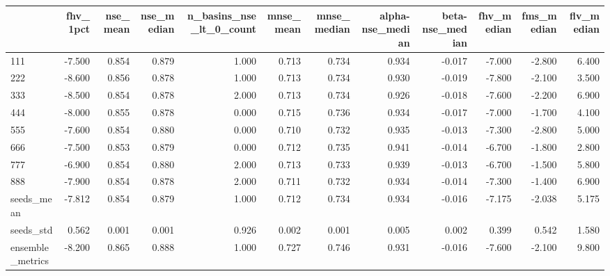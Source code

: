 \begin{tabular}{lrrrrrrrrrrr}
\toprule
 & fhv_1pct & nse_mean & nse_median & n_basins_nse_lt_0_count & mnse_mean & mnse_median & alpha-nse_median & beta-nse_median & fhv_median & fms_median & flv_median \\
\midrule
111 & -7.500 & 0.854 & 0.879 & 1.000 & 0.713 & 0.734 & 0.934 & -0.017 & -7.000 & -2.800 & 6.400 \\
222 & -8.600 & 0.856 & 0.878 & 1.000 & 0.713 & 0.734 & 0.930 & -0.019 & -7.800 & -2.100 & 3.500 \\
333 & -8.500 & 0.854 & 0.878 & 2.000 & 0.713 & 0.734 & 0.926 & -0.018 & -7.600 & -2.200 & 6.900 \\
444 & -8.000 & 0.855 & 0.878 & 0.000 & 0.715 & 0.736 & 0.934 & -0.017 & -7.000 & -1.700 & 4.100 \\
555 & -7.600 & 0.854 & 0.880 & 0.000 & 0.710 & 0.732 & 0.935 & -0.013 & -7.300 & -2.800 & 5.000 \\
666 & -7.500 & 0.853 & 0.879 & 0.000 & 0.712 & 0.735 & 0.941 & -0.014 & -6.700 & -1.800 & 2.800 \\
777 & -6.900 & 0.854 & 0.880 & 2.000 & 0.713 & 0.733 & 0.939 & -0.013 & -6.700 & -1.500 & 5.800 \\
888 & -7.900 & 0.854 & 0.878 & 2.000 & 0.711 & 0.732 & 0.934 & -0.014 & -7.300 & -1.400 & 6.900 \\
seeds_mean & -7.812 & 0.854 & 0.879 & 1.000 & 0.712 & 0.734 & 0.934 & -0.016 & -7.175 & -2.038 & 5.175 \\
seeds_std & 0.562 & 0.001 & 0.001 & 0.926 & 0.002 & 0.001 & 0.005 & 0.002 & 0.399 & 0.542 & 1.580 \\
ensemble_metrics & -8.200 & 0.865 & 0.888 & 1.000 & 0.727 & 0.746 & 0.931 & -0.016 & -7.600 & -2.100 & 9.800 \\
\bottomrule
\end{tabular}
